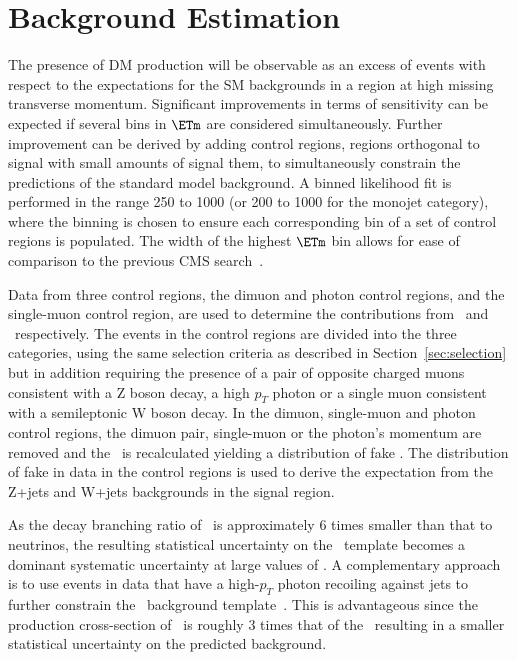 \section{Background Estimation}

The presence of DM production will be observable as an excess of events with respect to the expectations for the 
SM backgrounds in a region at high missing transverse momentum. Significant improvements in terms of sensitivity can be expected if 
several bins in $\ETm$ are considered simultaneously. Further
improvement can be derived by adding control regions, regions orthogonal to
signal with small amounts of signal them, to simultaneously
constrain the predictions of the standard model background. A binned likelihood fit is performed in the range 250 \gev to 1000 \gev (or 200 \gev to 1000 \gev 
for the monojet category), where the binning is chosen to ensure each
corresponding bin of a set of control regions is populated. The width of the highest $\ETm$ bin allows for ease of comparison to the previous CMS search~\cite{monojet1}. 

Data from three control regions, the dimuon and photon control regions, and the single-muon control region, are used to determine the contributions from \Zvvjets~and 
\Wlvjets~respectively. The events in the control regions are divided into the three  categories, using the same selection criteria as 
described in Section~\ref{sec:selection} but in addition requiring the presence of a pair of opposite charged muons consistent with a Z boson decay, a high $p_{T}$ photon 
or a single muon consistent with a semileptonic W boson decay.
In the dimuon, single-muon and photon control regions, the dimuon pair, single-muon or the photon's 
momentum are removed and the \ETm ~is recalculated yielding a distribution of fake \ETm. The distribution of fake \ETm 
in data in the control regions is used to derive the expectation from the Z+jets and W+jets backgrounds in the signal region.

As the decay branching ratio of \Zmm~is approximately 6 times smaller than that to neutrinos, the resulting statistical 
uncertainty on the \Zvvjets~template becomes a dominant systematic uncertainty at large values of \ETm.
A complementary approach is to use events in data that have a high-$p_{T}$ 
photon recoiling against jets to further constrain the \Zvvjets~background template~\cite{CMS-PAS-SUS-08-002}. This is advantageous since the production cross-section 
of \phojets~is roughly 3 times that of the \Zvvjets~resulting in a smaller statistical uncertainty on the predicted background. 
 
